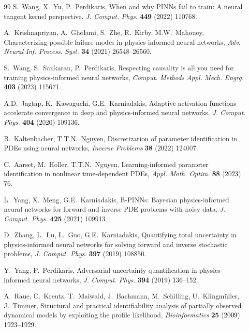 \documentclass[preprint,12pt]{elsarticle}
\begin{document}
\begin{thebibliography}{99}
S.~Wang, X.~Yu, P.~Perdikaris,
When and why PINNs fail to train: A neural tangent kernel perspective,
\textit{J. Comput. Phys.} \textbf{449} (2022) 110768.

A.~Krishnapriyan, A.~Gholami, S.~Zhe, R.~Kirby, M.W.~Mahoney,
Characterizing possible failure modes in physics-informed neural networks,
\textit{Adv. Neural Inf. Process. Syst.} \textbf{34} (2021) 26548--26560.

S.~Wang, S.~Sankaran, P.~Perdikaris,
Respecting causality is all you need for training physics-informed neural networks,
\textit{Comput. Methods Appl. Mech. Engrg.} \textbf{403} (2023) 115671.

A.D.~Jagtap, K.~Kawaguchi, G.E.~Karniadakis,
Adaptive activation functions accelerate convergence in deep and physics-informed neural networks,
\textit{J. Comput. Phys.} \textbf{404} (2020) 109136.

B.~Kaltenbacher, T.T.N.~Nguyen,
Discretization of parameter identification in PDEs using neural networks,
\textit{Inverse Problems} \textbf{38} (2022) 124007.

C.~Aarset, M.~Holler, T.T.N.~Nguyen,
Learning-informed parameter identification in nonlinear time-dependent PDEs,
\textit{Appl. Math. Optim.} \textbf{88} (2023) 76.

L.~Yang, X.~Meng, G.E.~Karniadakis,
B-PINNs: Bayesian physics-informed neural networks for forward and inverse PDE problems with noisy data,
\textit{J. Comput. Phys.} \textbf{425} (2021) 109913.

D.~Zhang, L.~Lu, L.~Guo, G.E.~Karniadakis,
Quantifying total uncertainty in physics-informed neural networks for solving forward and inverse stochastic problems,
\textit{J. Comput. Phys.} \textbf{397} (2019) 108850.

Y.~Yang, P.~Perdikaris,
Adversarial uncertainty quantification in physics-informed neural networks,
\textit{J. Comput. Phys.} \textbf{394} (2019) 136--152.

A.~Raue, C.~Kreutz, T.~Maiwald, J.~Bachmann, M.~Schilling, U.~Klingm{\"u}ller, J.~Timmer,
Structural and practical identifiability analysis of partially observed dynamical models by exploiting the profile likelihood,
\textit{Bioinformatics} \textbf{25} (2009) 1923--1929.


\end{thebibliography}
\end{document}
